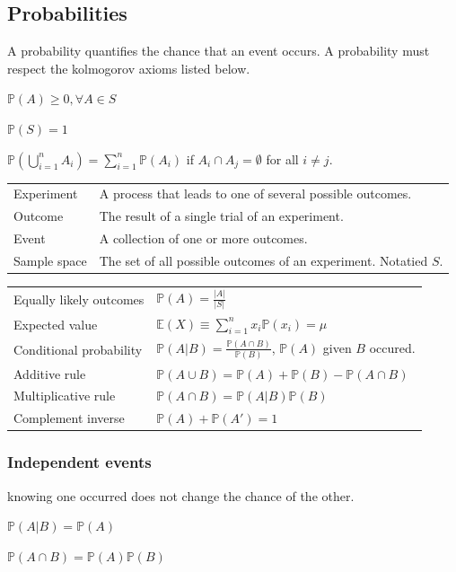 \documentclass[5pt]{article}
\begin{document}
\begin{multicols}{2}
\subsection{Probabilities}
A probability quantifies the chance that an event occurs. A probability must respect the kolmogorov axioms listed below.\\
\begin{enumerate*}
  \item $\mathbb{P}(A) \geq 0, \forall A \in S$\\
  \item $\mathbb{P}(S) = 1$\\
  \item $\mathbb{P}(\bigcup_{i=1}^n A_i) = \sum_{i=1}^n \mathbb{P}(A_i)$ if $A_i \cap A_j = \emptyset$ for all $i \neq j$.\\
\end{enumerate*}
\vspace{1pt}
\begin{tabular}{LL}
  Experiment   & A process that leads to one of several possible outcomes.\\
  Outcome      & The result of a single trial of an experiment.\\
  Event        & A collection of one or more outcomes.\\
  Sample space & The set of all possible outcomes of an experiment. Notatied $S$.\\
\end{tabular}
\begin{tabular}{LL}
  Equally likely outcomes & $\mathbb{P}(A) = \frac{|A|}{|S|}$\\
  Expected value          & $\mathbb{E}(X)\equiv \sum_{i=1}^n x_i \mathbb{P}(x_i)=\mu$\\
  Conditional probability & $\mathbb{P}(A|B)=\frac{\mathbb{P}(A\cap B)}{\mathbb{P}(B)}$, $\mathbb{P}(A)$ given $B$ occured. \\
  Additive rule           & $\mathbb{P}(A\cup B)=\mathbb{P}(A)+\mathbb{P}(B)-\mathbb{P}(A\cap B)$\\
  Multiplicative rule     & $\mathbb{P}(A\cap B)=\mathbb{P}(A|B)\mathbb{P}(B)$\\
  Complement inverse      & $\mathbb{P}(A) + \mathbb{P}(A') = 1$
\end{tabular}

\subsubsection{Independent events}
knowing one occurred does not change the chance of the other.
\begin{itemize*}
  \item $\mathbb{P}(A|B) = \mathbb{P}(A)\;\;$
  \item $\mathbb{P}(A\cap B) = \mathbb{P}(A)\mathbb{P}(B)$
\end{itemize*}


\end{multicols}
\end{document}
